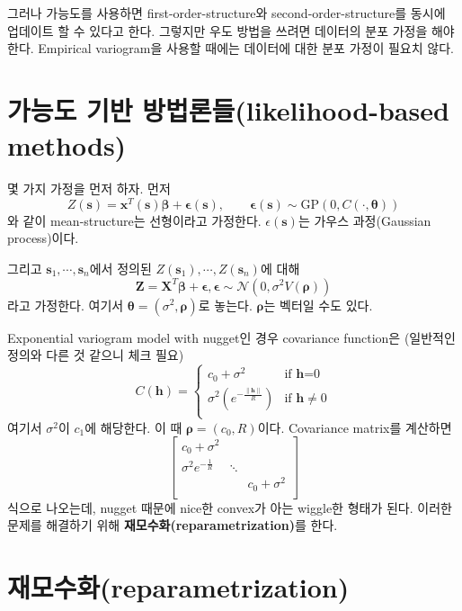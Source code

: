\documentclass[b5paper,]{scrbook}
\theoremstyle{plain}
\theoremstyle{definition}
\numberwithin{equation}{section}
\begin{document}
그러나 가능도를 사용하면 first-order-structure와
second-order-structure를 동시에 업데이트 할 수 있다고 한다. 그렇지만
우도 방법을 쓰려면 데이터의 분포 가정을 해야 한다. Empirical variogram을
사용할 때에는 데이터에 대한 분포 가정이 필요치 않다.

\section{가능도 기반 방법론들(likelihood-based
methods)}\label{--likelihood-based-methods}

몇 가지 가정을 먼저 하자. 먼저
\[Z(\mathbf{s})=\mathbf{x}^{T}(\mathbf{s})\boldsymbol{\beta}+\boldsymbol{\epsilon}(\mathbf{s}), \qquad{\boldsymbol{\epsilon}(\mathbf{s}) \sim  \text{GP}(0, C(\cdot, \boldsymbol{\theta}))}\]
와 같이 mean-structure는 선형이라고 가정한다. \(\epsilon(\mathbf{s})\)는
가우스 과정(Gaussian process)이다.

그리고 \(\mathbf{s}_{1}, \cdots , \mathbf{s}_{n}\)에서 정의된
\(Z(\mathbf{s}_{1}), \cdots , Z(\mathbf{s}_{n})\)에 대해
\[\mathbf{Z}=\mathbf{X}^{T}\boldsymbol{\beta}+\boldsymbol{\epsilon}, \boldsymbol{\epsilon} \sim \mathcal{N}(0, \sigma^{2}V(\boldsymbol{\rho}))\]
라고 가정한다. 여기서
\(\boldsymbol{\theta}=(\sigma^{2}, \boldsymbol{\rho})\)로 놓는다.
\(\boldsymbol{\rho}\)는 벡터일 수도 있다.

Exponential variogram model with nugget인 경우 covariance function은
(일반적인 정의와 다른 것 같으니 체크 필요) \[
C(\mathbf{h})=
\begin{cases}
c_{0}+\sigma^{2} & \text{if $\mathbf{h}$=0}\\
\sigma^{2}(e^{-\frac{\|\mathbf{h}\|}{R}}) & \text{if $\mathbf{h}\neq 0$}\\
\end{cases}
\] 여기서 \(\sigma^{2}\)이 \(c_{1}\)에 해당한다. 이 때
\(\boldsymbol{\rho}=(c_{0},R)\)이다. Covariance matrix를 계산하면 \[
\begin{bmatrix}
c_{0}+\sigma^{2} &  &  \\
\sigma^{2}e^{-\frac{1}{R}} & \ddots &  \\
 &  & c_{0}+\sigma^{2}\\
\end{bmatrix}
\] 식으로 나오는데, nugget 때문에 nice한 convex가 아는 wiggle한 형태가
된다. 이러한 문제를 해결하기 위해 \textbf{재모수화(reparametrization)}를
한다.

\section{재모수화(reparametrization)}\label{reparametrization}
\end{document}
